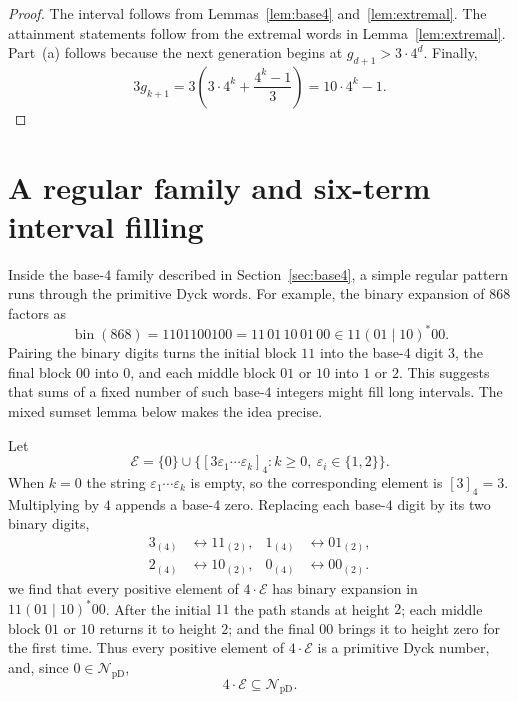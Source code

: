 \documentclass[12pt]{article}
\theoremstyle{plain}
\theoremstyle{definition}
\theoremstyle{plain}
\newcommand{\val}[2]{[#1]_{#2}}
\newcommand{\NpD}{\mathcal{N}_{\mathrm{pD}}}
\begin{document}
\begin{proof}
The interval follows from Lemmas~\ref{lem:base4} and~\ref{lem:extremal}.  The
attainment statements follow from the extremal words in
Lemma~\ref{lem:extremal}.  Part~(a) follows because the next generation begins
at $g_{d+1}>3\cdot4^d$.  Finally,
\[
  3g_{k+1}
  =3\left(3\cdot4^k+\frac{4^k-1}{3}\right)
  =10\cdot4^k-1.
\]
\end{proof}

\section{A regular family and six-term interval filling}\label{sec:regular}

Inside the base-$4$ family described in Section~\ref{sec:base4}, a simple regular pattern runs through the primitive Dyck words.  For
example, the binary expansion of $868$ factors as
\[
 \operatorname{bin}(868)=1101100100=11\,01\,10\,01\,00
 \in 11(01\mid10)^*00 .
\]
Pairing the binary digits turns the initial block $11$ into the base-$4$
digit $3$, the final block $00$ into $0$, and each middle block $01$ or
$10$ into $1$ or $2$.  This suggests that sums of a fixed number of such
base-$4$ integers might fill long intervals.  The mixed sumset lemma
below makes the idea precise.

Let
\[
 \mathcal E=\{0\}\cup
 \bigl\{\val{3\varepsilon_1\cdots\varepsilon_k}{4}:
        k\geq0,\ \varepsilon_i\in\{1,2\}\bigr\}.
\]
When $k=0$ the string $\varepsilon_1\cdots\varepsilon_k$ is empty, so
the corresponding element is $\val{3}{4}=3$.  Multiplying by $4$ appends
a base-$4$ zero.  Replacing each base-$4$ digit by its two binary digits,
\[
\begin{aligned}
 3_{(4)}&\longleftrightarrow11_{(2)},&
 1_{(4)}&\longleftrightarrow01_{(2)},\\
 2_{(4)}&\longleftrightarrow10_{(2)},&
 0_{(4)}&\longleftrightarrow00_{(2)}.
\end{aligned}
\]
we find that every positive element of $4\cdot\mathcal E$ has binary
expansion in $11(01\mid10)^*00$.  After the initial $11$ the path stands
at height $2$; each middle block $01$ or $10$ returns it to height $2$;
and the final $00$ brings it to height zero for the first time.  Thus
every positive element of $4\cdot\mathcal E$ is a primitive Dyck number,
and, since $0\in\NpD$,
\begin{equation}\label{eq:4E}
        4\cdot\mathcal E\subseteq\NpD.
\end{equation}
\end{document}
